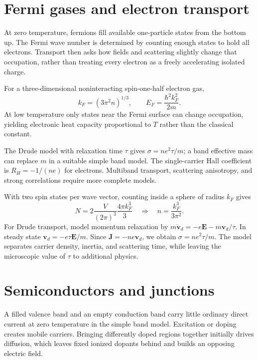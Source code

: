 \documentclass[11pt,oneside]{book}
\newcommand{\vect}[1]{\boldsymbol{#1}}
\theoremstyle{reviewstyle}
\begin{document}
\section{Fermi gases and electron transport}
At zero temperature, fermions fill available one-particle states from the bottom up. The Fermi wave number is determined by counting enough states to hold all electrons. Transport then asks how fields and scattering slightly change that occupation, rather than treating every electron as a freely accelerating isolated charge.

For a three-dimensional noninteracting spin-one-half electron gas,
\begin{equation}k_F=(3\pi^2n)^{1/3},\qquad E_F=\frac{\hbar^2k_F^2}{2m}.\end{equation}
At low temperature only states near the Fermi surface can change occupation, yielding electronic heat capacity proportional to $T$ rather than the classical constant.

The Drude model with relaxation time $\tau$ gives $\sigma=ne^2\tau/m$; a band effective mass can replace $m$ in a suitable simple band model. The single-carrier Hall coefficient is $R_H=-1/(ne)$ for electrons. Multiband transport, scattering anisotropy, and strong correlations require more complete models.

With two spin states per wave vector, counting inside a sphere of radius $k_F$ gives
\begin{equation}
N=2\frac{V}{(2\pi)^3}\frac{4\pi k_F^3}{3}
\quad\Longrightarrow\quad n=\frac{k_F^3}{3\pi^2}.
\end{equation}
For Drude transport, model momentum relaxation by $m\dot{\vect v}_d=-e\vect E-m\vect v_d/\tau$. In steady state $\vect v_d=-e\tau\vect E/m$. Since $\vect J=-ne\vect v_d$, we obtain $\sigma=ne^2\tau/m$. The model separates carrier density, inertia, and scattering time, while leaving the microscopic value of $\tau$ to additional physics.

\section{Semiconductors and junctions}
A filled valence band and an empty conduction band carry little ordinary direct current at zero temperature in the simple band model. Excitation or doping creates mobile carriers. Bringing differently doped regions together initially drives diffusion, which leaves fixed ionized dopants behind and builds an opposing electric field.
\end{document}
